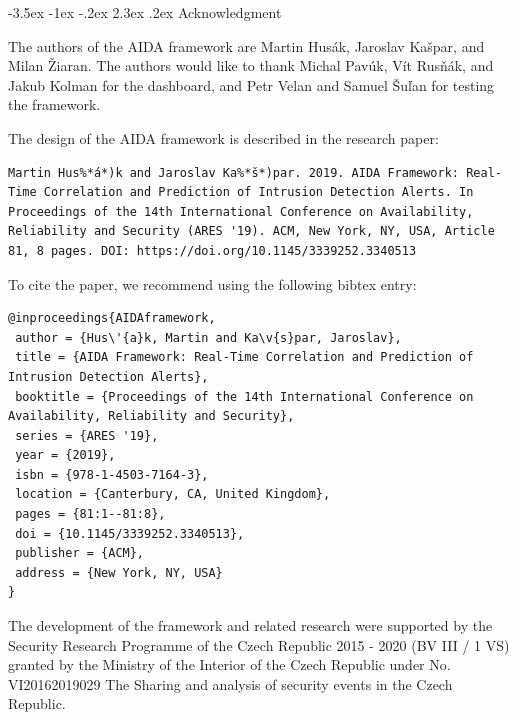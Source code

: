 \documentclass[a4paper]{article} %
\makeatletter
\renewcommand\section{\@startsection {section}{1}{\z@}%
                   {-3.5ex \@plus -1ex \@minus -.2ex}%
                   {2.3ex \@plus.2ex}%
                   {\normalfont\sffamily\Large\bfseries\color{projectcolor}}}
\renewcommand\subsection{\@startsection{subsection}{2}{\z@}%
                   {-3.25ex\@plus -1ex \@minus -.2ex}%
                   {1.5ex \@plus .2ex}%
                   {\normalfont\sffamily\large\bfseries\color{projectcolor}}}
\makeatother
\begin{document}
% 

\cleardoublepage

\section{Acknowledgment}

The authors of the AIDA framework are Martin Hus\'{a}k, Jaroslav Ka\v{s}par, and Milan \v{Z}iaran. The authors would like to thank Michal Pav\'{u}k, V\'{i}t Rus\v{n}\'{a}k, and Jakub Kolman for the dashboard, and Petr Velan and Samuel \v{S}u\v{l}an for testing the framework.

\bigskip

The design of the AIDA framework is described in the research paper:
\begin{lstlisting}[]
Martin Hus%*á*)k and Jaroslav Ka%*š*)par. 2019. AIDA Framework: Real-Time Correlation and Prediction of Intrusion Detection Alerts. In Proceedings of the 14th International Conference on Availability, Reliability and Security (ARES '19). ACM, New York, NY, USA, Article 81, 8 pages. DOI: https://doi.org/10.1145/3339252.3340513
\end{lstlisting}

To cite the paper, we recommend using the following bibtex entry:
\begin{lstlisting}[]
@inproceedings{AIDAframework,
 author = {Hus\'{a}k, Martin and Ka\v{s}par, Jaroslav},
 title = {AIDA Framework: Real-Time Correlation and Prediction of Intrusion Detection Alerts},
 booktitle = {Proceedings of the 14th International Conference on Availability, Reliability and Security},
 series = {ARES '19},
 year = {2019},
 isbn = {978-1-4503-7164-3},
 location = {Canterbury, CA, United Kingdom},
 pages = {81:1--81:8},
 doi = {10.1145/3339252.3340513},
 publisher = {ACM},
 address = {New York, NY, USA}
}
\end{lstlisting}

The development of the framework and related research were supported by the Security Research Programme of the Czech Republic 2015 - 2020 (BV III / 1 VS) granted by the Ministry of the Interior of the Czech Republic under No. VI20162019029 The Sharing and analysis of security events in the Czech Republic.
\end{document}
